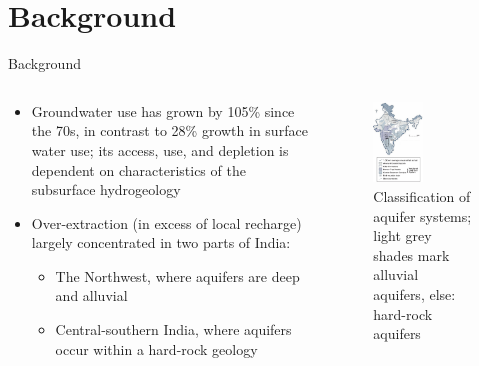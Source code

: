 \documentclass[10pt]{beamer}
\begin{document}
\section{Background}
\begin{frame}
	{Background}
	\begin{columns}
		\begin{column}{0.5\textwidth}
			\begin{itemize}
				\item Groundwater use has grown by 105\% since the 70s, in contrast to 28\% growth in surface water use; its access, use, and depletion is dependent on characteristics of the subsurface hydrogeology
				\item Over-extraction (in excess of local recharge) largely concentrated in two parts of India:
				      \begin{itemize}
					      \item The Northwest, where aquifers are deep and alluvial
					      \item Central-southern India, where aquifers occur within a hard-rock geology
				      \end{itemize}
			\end{itemize}
		\end{column}
		\begin{column}{0.5\textwidth}
			\centering
			\begin{figure}
				\centering
				\includegraphics[width=0.5\textwidth]{figure1_right.png}
				\caption{Classification of aquifer systems; light grey shades mark alluvial aquifers, else: hard-rock aquifers}
			\end{figure}
		\end{column}
	\end{columns}
\end{frame}
\end{document}
